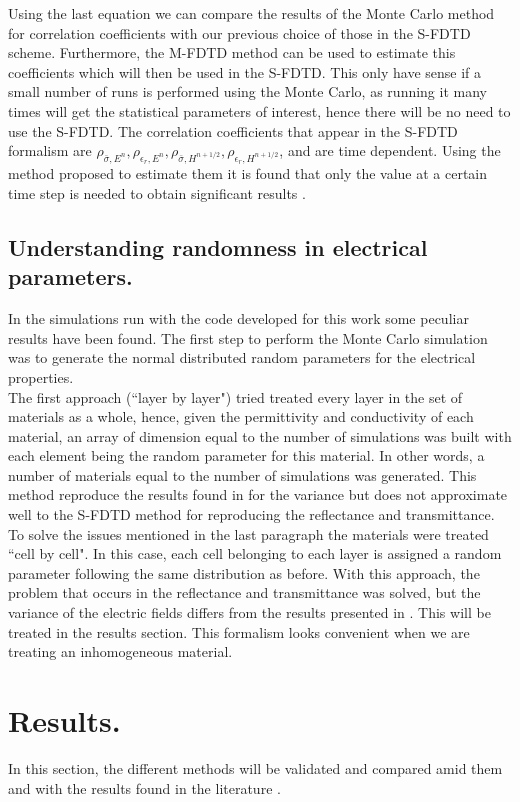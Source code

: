 \documentclass[12pt, oneside]{book}
\begin{document}
Using the last equation we can compare the results of the Monte Carlo method for correlation coefficients with our previous choice of those in the S-FDTD scheme. Furthermore, the M-FDTD method can be used to estimate this coefficients which will then be used in the S-FDTD. This only have sense if a small number of runs is performed using the Monte Carlo, as running it many times will get the statistical parameters of interest, hence there will be no need to use the S-FDTD. The correlation coefficients that appear in the S-FDTD formalism are $\rho_{\bar{\sigma},E^n},\rho_{\epsilon_r,E^n},\rho_{\bar{\sigma},H^{n+1/2}},\rho_{\epsilon_r,H^{n+1/2}}$, and are time dependent. Using the method proposed to estimate them it is found that only the value at a certain time step is needed to obtain significant results \cite{Bisheh2015}.

\section{Understanding randomness in electrical parameters.}
In the simulations run with the code developed for this work some peculiar results have been found. The first step to perform the Monte Carlo simulation was to generate the normal distributed random parameters for the electrical properties. \\
\indent The first approach (``layer by layer") tried treated every layer in the set of materials as a whole, hence, given the permittivity and conductivity of each material, an array of dimension equal to the number of simulations was built with each element being the random parameter for this material. In other words, a number of materials equal to the number of simulations was generated. This method reproduce the results found in \cite{smith2011stochastic} for the variance but does not approximate well to the S-FDTD method for reproducing the reflectance and transmittance. \\
\indent To solve the issues mentioned in the last paragraph the materials were treated ``cell by cell". In this case, each cell belonging to each layer is assigned a random parameter following the same distribution as before. With this approach, the problem that occurs in the reflectance and transmittance was solved, but the variance of the electric fields differs from the results presented in \cite{smith2011stochastic}. This will be treated in the results section. This formalism looks convenient when we are treating an inhomogeneous material.

\chapter{Results.}
In this section, the different methods will be validated and compared amid them and with the results found in the literature \cite{smith2011stochastic}.
\end{document}

